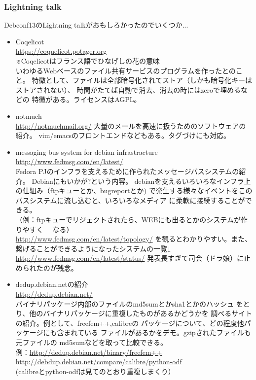 \documentclass[mingoth,a4paper]{jsarticle}
\begin{document}
\subsubsection{Lightning talk}

 Debconf13のLightning talkがおもしろかったのでいくつか...

\begin{itemize}
\item Coqelicot \\
\url{https://coquelicot.potager.org}\\
※Coqelicotはフランス語でひなげしの花の意味\\
いわゆるWebベースのファイル共有サービスのプログラムを作ったとのこと。
特徴として、ファイルは全部暗号化されてストア（しかも暗号化キーはストアされない）、
時間がたてば自動で消去、消去の時にはzeroで埋めるなどの
特徴がある。ライセンスはAGPL。
\item notmuch \\
\url{http://notmuchmail.org/}
大量のメールを高速に扱うためのソフトウェアの紹介。
vim/emacsのフロントエンドなどもある。タグづけにも対応。
\end{itemize}

\begin{itemize}
\item  messaging bus system for debian infrastracture\\
\url{http://www.fedmsg.com/en/latest/}\\
Fedora PJのインフラを支えるために作られたメッセージバスシステムの紹介。
Debianにもいかが?という内容。
debianを支えるいろいろなインフラ上の仕組み（ftpキューとか、bugreportとか)
で発生する様々なイベントをこのバスシステムに流し込むと、いろいろなメディア
に柔軟に接続することができる。\\
（例：ftpキューでリジェクトされたら、WEBにも出るとかのシステムが作りやすく
　なる）\\
\url{http://www.fedmsg.com/en/latest/topology/}
を観るとわかりやすい。また、\\
繋げることができるようになったシステムの一覧↓\\
\url{http://www.fedmsg.com/en/latest/status/}
発表長すぎて司会（ドラ娘）に止められたのが残念。
\end{itemize}

\begin{itemize}
\item dedup.debian.netの紹介\\
\url{http://dedup.debian.net/}\\
バイナリパッケージ内部のファイルのmd5sumとかsha1とかのハッシュ
をとり、他のバイナリパッケージに重複したものがあるかどうかを
調べるサイトの紹介。例として、freefem++,calibreの
パッケージについて、どの程度他パッケージにも含まれている
ファイルがあるかをデモ。gzipされたファイルも元ファイルの
md5sumなどを取って比較できる。\\
例：\url{http://dedup.debian.net/binary/freefem++}\\
    \url{http://debdup.debian.net/compare/calibre/python-odf}\\
   (calibreとpython-odfは見てのとおり重複しまくり）\\
\end{itemize}
\end{document}
